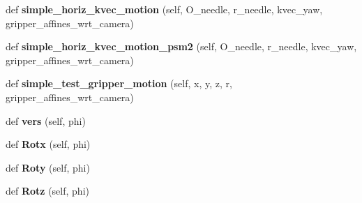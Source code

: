 \begin{DoxyCompactItemize}
\item 
def {\bfseries simple\+\_\+horiz\+\_\+kvec\+\_\+motion} (self, O\+\_\+needle, r\+\_\+needle, kvec\+\_\+yaw, gripper\+\_\+affines\+\_\+wrt\+\_\+camera)\hypertarget{classneedle__planner__camera__working_1_1needle__planner_a4ea8c2ac11b67ef843322eaf9f2bf34b}{}\label{classneedle__planner__camera__working_1_1needle__planner_a4ea8c2ac11b67ef843322eaf9f2bf34b}

\item 
def {\bfseries simple\+\_\+horiz\+\_\+kvec\+\_\+motion\+\_\+psm2} (self, O\+\_\+needle, r\+\_\+needle, kvec\+\_\+yaw, gripper\+\_\+affines\+\_\+wrt\+\_\+camera)\hypertarget{classneedle__planner__camera__working_1_1needle__planner_ad62fb5e5c1915ad55ca6417a3ff82080}{}\label{classneedle__planner__camera__working_1_1needle__planner_ad62fb5e5c1915ad55ca6417a3ff82080}

\item 
def {\bfseries simple\+\_\+test\+\_\+gripper\+\_\+motion} (self, x, y, z, r, gripper\+\_\+affines\+\_\+wrt\+\_\+camera)\hypertarget{classneedle__planner__camera__working_1_1needle__planner_af0ecb86154ee3343c9fe424232bcaa18}{}\label{classneedle__planner__camera__working_1_1needle__planner_af0ecb86154ee3343c9fe424232bcaa18}

\item 
def {\bfseries vers} (self, phi)\hypertarget{classneedle__planner__camera__working_1_1needle__planner_aab68269cc59b047e9ccfc3e28a94e46c}{}\label{classneedle__planner__camera__working_1_1needle__planner_aab68269cc59b047e9ccfc3e28a94e46c}

\item 
def {\bfseries Rotx} (self, phi)\hypertarget{classneedle__planner__camera__working_1_1needle__planner_a370ebfd0a544a33eb466801bcd9e9d7d}{}\label{classneedle__planner__camera__working_1_1needle__planner_a370ebfd0a544a33eb466801bcd9e9d7d}

\item 
def {\bfseries Roty} (self, phi)\hypertarget{classneedle__planner__camera__working_1_1needle__planner_af75dd456aced3f9d264083b813b1c8d5}{}\label{classneedle__planner__camera__working_1_1needle__planner_af75dd456aced3f9d264083b813b1c8d5}

\item 
def {\bfseries Rotz} (self, phi)\hypertarget{classneedle__planner__camera__working_1_1needle__planner_a0de3fc72485a3587ad45d0247210c73d}{}\label{classneedle__planner__camera__working_1_1needle__planner_a0de3fc72485a3587ad45d0247210c73d}


\end{DoxyCompactItemize}
